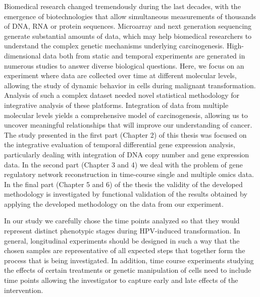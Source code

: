 \begin{conclusion}

 Biomedical research changed tremendously during the last decades, with the emergence of biotechnologies that allow simultaneous measurements of thousands of DNA, RNA or protein sequences. Microarray and next generation sequencing generate substantial amounts of data, which may help biomedical researchers to understand the complex genetic mechanisms underlying carcinogenesis. High-dimensional data both from static and temporal experiments are generated in numerous studies to answer diverse biological questions. Here, we focus on an experiment where data are collected over time at different molecular levels, allowing the study of dynamic behavior in cells during malignant transformation. Analysis of such a complex dataset needed novel statistical methodology for integrative analysis of these platforms. Integration of data from multiple molecular levels yields a comprehensive model of carcinogenesis, allowing us to uncover meaningful relationships that will improve our understanding of cancer. The study presented in the first part (Chapter 2) of this thesis was focused on the integrative evaluation of temporal differential gene expression analysis, particularly dealing with integration of DNA copy number and gene expression data. In the second part (Chapter 3 and 4) we deal with the problem of gene regulatory network reconstruction in time-course single and multiple omics data. In the final part (Chapter 5 and 6) of the thesis the validity of the developed methodology is investigated by functional validation of the results obtained by applying the developed methodology on the data from our experiment. 

In our study we carefully chose the time points analyzed so that they would represent distinct phenotypic stages during HPV-induced transformation. In general, longitudinal experiments should be designed in such a way that the chosen samples are representative of all expected steps that together form the process that is being investigated. In addition, time course experiments studying the effects of certain treatments or genetic manipulation of cells need to include time points allowing the investigator to capture early and late effects of the intervention.


\end{conclusion}
